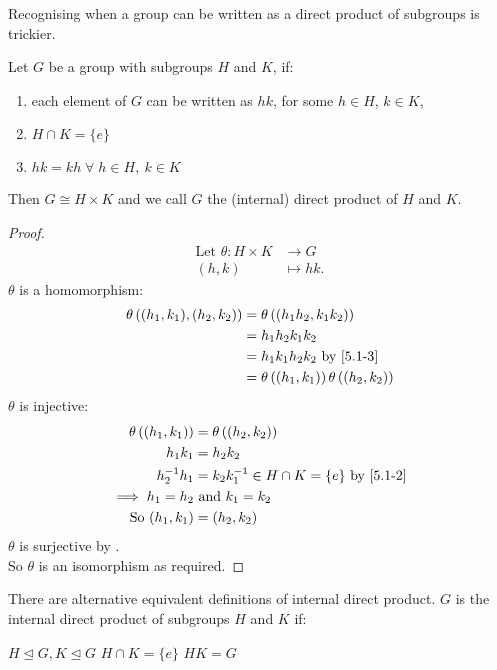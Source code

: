 Recognising when a group can be written as a direct product of subgroups is trickier.

\begin{proposition}
  Let $G$ be a group with subgroups $H$ and $K$, if:
  \begin{enumerate}
    \item each element of $G$ can be written as $hk$, for some $h \in H$, $k \in K$, \label{5.1-1}
    \item $H \cap K = \{ e \}$ \label{5.1-2}
    \item $hk = kh \; \forall \; h \in H,\ k \in K$ \label{5.1-3}
  \end{enumerate} 
  Then $G \cong H \times K$ and we call $G$ the (internal) direct product of $H$ and $K$.
\end{proposition} 

\begin{proof}
  \begin{align*}
    \text{Let } \theta : H \times K &\to G \\
    (h, k) &\mapsto hk.
  \end{align*} 
  $\theta$ is a homomorphism:
  \begin{align*}
    \theta \left( (h_1, k_1), (h_2, k_2) \right) &= \theta \left( (h_1 h_2, k_1 k_2) \right) \\
    &= h_1 h_2 k_1 k_2 \\
    &= h_1 k_1 h_2 k_2 \text{ by } \Cref{5.1-3} \\
    &= \theta \left( (h_1, k_1) \right) \theta \left( (h_2, k_2) \right)
  \end{align*} 
  $\theta$ is injective:
  \begin{align*}
    \theta \left( (h_1, k_1) \right) &= \theta \left( (h_2, k_2) \right) \\
    h_1 k_1 &= h_2 k_2 \\
    h_2^{-1} h_1 &= k_2 k_1^{-1} \in H \cap K = \{ e \} \text{ by \Cref{5.1-2}} \\
    \implies h_1 = h_2 &\text{ and } k_1 = k_2 \\
    \text{So } (h_1, k_1) &= (h_2, k_2)
  \end{align*} 
  $\theta$ is surjective by . \\
  So $\theta$ is an isomorphism as required.
\end{proof} 

\begin{remark} \label{rem:internal2}
  There are alternative equivalent definitions of internal direct product.
  $G$ is the internal direct product of subgroups $H$ and $K$ if:
  \begin{symenum}
     $H \trianglelefteq G, K \trianglelefteq G$ \label{5.1-1'}
     $H \cap K = \{ e \}$ \label{5.1-2'}
     $HK = G$ \label{5.1-3'}
  \end{symenum} 
\end{remark} 

